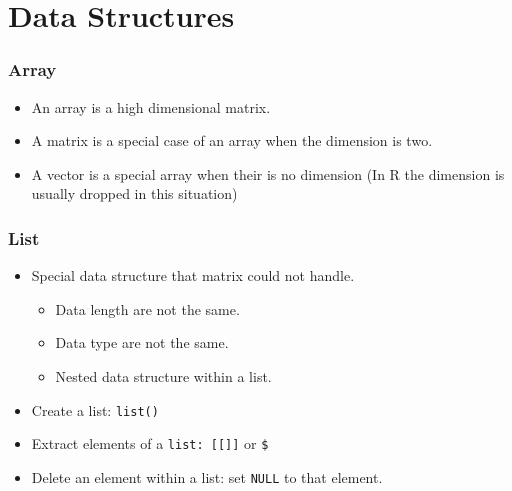 \documentclass[10pt]{beamer}
\begin{document}
\section{Data Structures}

\begin{frame}
  \frametitle{Array}

  \begin{itemize}
  \item An array is a high dimensional matrix.
  \item A matrix is a special case of an array when the dimension is
    two.
  \item A vector is a special array when their is no dimension (In R
    the dimension is usually dropped in this situation)
  \end{itemize}
\end{frame}

\begin{frame}
  \frametitle{List}

  \begin{itemize}
  \item Special data structure that matrix could not handle.

    \begin{itemize}
    \item Data length are not the same.
    \item Data type are not the same.
    \item Nested data structure within a list.
    \end{itemize}

  \item Create a list: \texttt{list()}
  \item Extract elements of a \texttt{list: [[]]} or \texttt{\$}

  \item Delete an element within a list: set \texttt{NULL} to that element.

  \end{itemize}
\end{frame}
\end{document}
